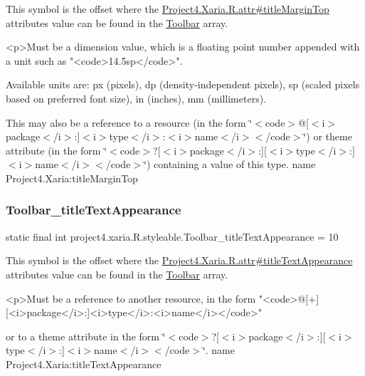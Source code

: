 This symbol is the offset where the \hyperlink{}{Project4.\+Xaria.\+R.\+attr\#title\+Margin\+Top} attribute\textquotesingle{}s value can be found in the \hyperlink{classproject4_1_1xaria_1_1R_1_1styleable_af6c30f9e9e086f6bf4e510669443fa59}{Toolbar} array.

\begin{DoxyVerb}      <p>Must be a dimension value, which is a floating point number appended with a unit such as "<code>14.5sp</code>".
\end{DoxyVerb}
 Available units are\+: px (pixels), dp (density-\/independent pixels), sp (scaled pixels based on preferred font size), in (inches), mm (millimeters). 

This may also be a reference to a resource (in the form \char`\"{}$<$code$>$@\mbox{[}$<$i$>$package$<$/i$>$\+:\mbox{]}$<$i$>$type$<$/i$>$\+:$<$i$>$name$<$/i$>$$<$/code$>$\char`\"{}) or theme attribute (in the form \char`\"{}$<$code$>$?\mbox{[}$<$i$>$package$<$/i$>$\+:\mbox{]}\mbox{[}$<$i$>$type$<$/i$>$\+:\mbox{]}$<$i$>$name$<$/i$>$$<$/code$>$\char`\"{}) containing a value of this type.  name Project4.\+Xaria\+:title\+Margin\+Top \mbox{\label{classproject4_1_1xaria_1_1R_1_1styleable_ab0deb931fcb51a59a9c57d317339ad4d}} 
\subsubsection{\texorpdfstring{Toolbar\+\_\+title\+Text\+Appearance}{Toolbar\_titleTextAppearance}}
{\footnotesize\ttfamily static final int project4.\+xaria.\+R.\+styleable.\+Toolbar\+\_\+title\+Text\+Appearance = 10\hspace{0.3cm}{\ttfamily [static]}}

This symbol is the offset where the \hyperlink{}{Project4.\+Xaria.\+R.\+attr\#title\+Text\+Appearance} attribute\textquotesingle{}s value can be found in the \hyperlink{classproject4_1_1xaria_1_1R_1_1styleable_af6c30f9e9e086f6bf4e510669443fa59}{Toolbar} array.

\begin{DoxyVerb}      <p>Must be a reference to another resource, in the form "<code>@[+][<i>package</i>:]<i>type</i>:<i>name</i></code>"
\end{DoxyVerb}
 or to a theme attribute in the form \char`\"{}$<$code$>$?\mbox{[}$<$i$>$package$<$/i$>$\+:\mbox{]}\mbox{[}$<$i$>$type$<$/i$>$\+:\mbox{]}$<$i$>$name$<$/i$>$$<$/code$>$\char`\"{}.  name Project4.\+Xaria\+:title\+Text\+Appearance \mbox{\label{classproject4_1_1xaria_1_1R_1_1styleable_ae59bec88cab4e203af7c4a6242b338ed}} 
